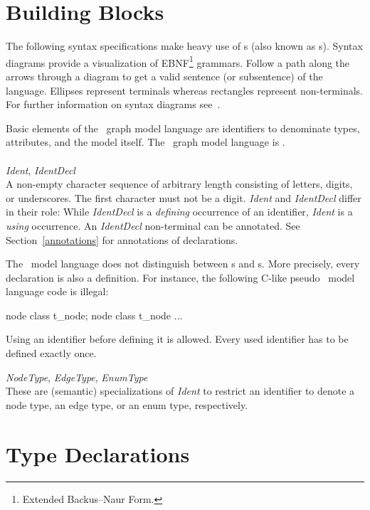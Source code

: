 \section{Building Blocks}
\label{modelbb}

\begin{note}
The following syntax specifications make heavy use of s (also known as s). Syntax diagrams provide a visualization of EBNF\footnote{Extended Backus–Naur Form.} grammars. Follow a path along the arrows through a diagram to get a valid sentence (or subsentence) of the language. Ellipses represent terminals whereas rectangles represent non-terminals. For further information on syntax diagrams see~\cite{MMJW:91}.
\end{note}
Basic elements of the \GrG\ graph model language are identifiers to denominate types, attributes, and the model itself. The \GrG\ graph model language is .\\
\\
\emph{Ident}, \emph{IdentDecl}\\ \nopagebreak
A non-empty character sequence of arbitrary length consisting of letters, digits, or underscores. The first character must not be a digit. \emph{Ident} and \emph{IdentDecl} differ in their role: While \emph{IdentDecl} is a \emph{defining} occurrence of an identifier, \emph{Ident} is a \emph{using} occurrence. An \emph{IdentDecl} non-terminal can be annotated. See Section~\ref{annotations} for annotations of declarations.
\begin{note}
\label{note:modeldecl}
  The \GrG\ model language does not distinguish between s and s. More precisely, every declaration is also a definition. For instance, the following C-like pseudo \GrG\ model language code is illegal:
\begin{grgen}
node class t_node;
node class t_node {
  ...
}
\end{grgen}
Using an identifier before defining it is allowed. Every used identifier has to be defined exactly once.
\end{note}
\pagebreak
\emph{NodeType}, \emph{EdgeType}, \emph{EnumType}\\ \nopagebreak
These are (semantic) specializations of \emph{Ident} to restrict an identifier to denote a node type, an edge type, or an enum type, respectively.

\section{Type Declarations}
\label{typedecl}

